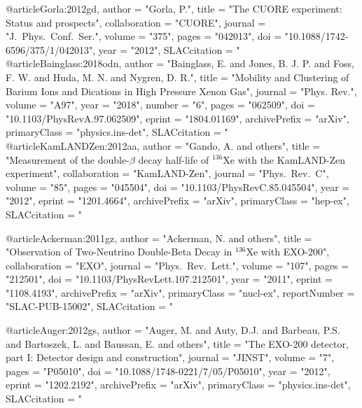 {{@article{Gorla:2012gd,
      author         = "Gorla, P.",
      title          = "{The CUORE experiment: Status and prospects}",
      collaboration  = "CUORE",
      journal        = "J.\ Phys.\ Conf.\ Ser.",
      volume         = "375",
      pages          = "042013",
      doi            = "10.1088/1742-6596/375/1/042013",
      year           = "2012",
      SLACcitation   = "%
}
@article{Bainglass:2018odn,
      author         = "Bainglass, E. and Jones, B. J. P. and Foss, F. W. and
                        Huda, M. N. and Nygren, D. R.",
      title          = "{Mobility and Clustering of Barium Ions and Dications in
                        High Pressure Xenon Gas}",
      journal        = "Phys. Rev.",
      volume         = "A97",
      year           = "2018",
      number         = "6",
      pages          = "062509",
      doi            = "10.1103/PhysRevA.97.062509",
      eprint         = "1804.01169",
      archivePrefix  = "arXiv",
      primaryClass   = "physics.ins-det",
      SLACcitation   = "%
}
@article{KamLANDZen:2012aa,
      author         = "Gando, A. and others",
      title          = "{Measurement of the double-$\beta$ decay half-life of
                        $^{136}$Xe with the KamLAND-Zen experiment}",
      collaboration  = "KamLAND-Zen",
      journal        = "Phys.\ Rev.\ C",
      volume         = "85",
      pages          = "045504",
      doi            = "10.1103/PhysRevC.85.045504",
      year           = "2012",
      eprint         = "1201.4664",
      archivePrefix  = "arXiv",
      primaryClass   = "hep-ex",
      SLACcitation   = "%
}

@article{Ackerman:2011gz,
      author         = "Ackerman, N. and others",
      title          = "{Observation of Two-Neutrino Double-Beta Decay in $^{136}$Xe with EXO-200}",
      collaboration  = "EXO",
      journal        = "Phys.\ Rev.\ Lett.",
      volume         = "107",
      pages          = "212501",
      doi            = "10.1103/PhysRevLett.107.212501",
      year           = "2011",
      eprint         = "1108.4193",
      archivePrefix  = "arXiv",
      primaryClass   = "nucl-ex",
      reportNumber   = "SLAC-PUB-15002",
      SLACcitation   = "%
}


@article{Auger:2012gs,
      author         = "Auger, M. and Auty, D.J. and Barbeau, P.S. and Bartoszek,
                        L. and Baussan, E. and others",
      title          = "{The EXO-200 detector, part I: Detector design and
                        construction}",
      journal        = "JINST",
      volume         = "7",
      pages          = "P05010",
      doi            = "10.1088/1748-0221/7/05/P05010",
      year           = "2012",
      eprint         = "1202.2192",
      archivePrefix  = "arXiv",
      primaryClass   = "physics.ins-det",
      SLACcitation   = "%
}

}}
